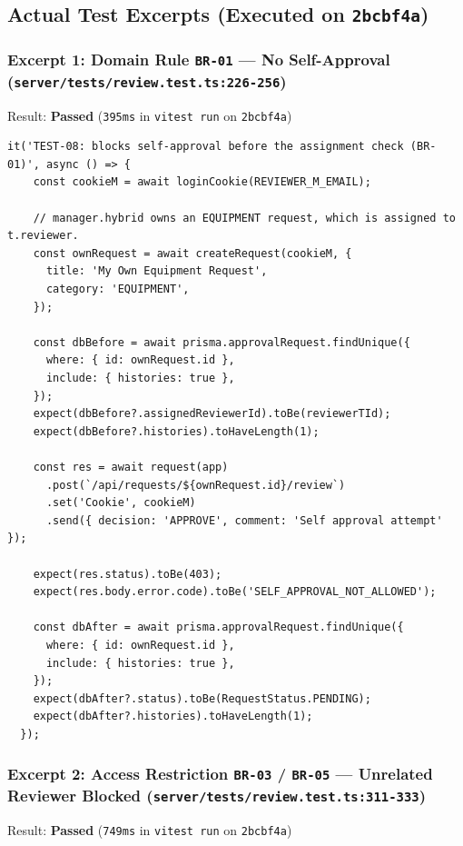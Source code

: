 \documentclass[11pt,a4paper]{article}
\begin{document}
\subsection{Actual Test Excerpts (Executed on \texttt{2bcbf4a})}

\subsubsection{Excerpt 1: Domain Rule \texttt{BR-01} — No Self-Approval (\texttt{server/tests/review.test.ts:226-256})}
Result: \textbf{Passed} (\texttt{395ms} in \texttt{vitest run} on \texttt{2bcbf4a})\\

\begin{lstlisting}[basicstyle=\ttfamily\scriptsize]
  it('TEST-08: blocks self-approval before the assignment check (BR-01)', async () => {
    const cookieM = await loginCookie(REVIEWER_M_EMAIL);

    // manager.hybrid owns an EQUIPMENT request, which is assigned to t.reviewer.
    const ownRequest = await createRequest(cookieM, {
      title: 'My Own Equipment Request',
      category: 'EQUIPMENT',
    });

    const dbBefore = await prisma.approvalRequest.findUnique({
      where: { id: ownRequest.id },
      include: { histories: true },
    });
    expect(dbBefore?.assignedReviewerId).toBe(reviewerTId);
    expect(dbBefore?.histories).toHaveLength(1);

    const res = await request(app)
      .post(`/api/requests/${ownRequest.id}/review`)
      .set('Cookie', cookieM)
      .send({ decision: 'APPROVE', comment: 'Self approval attempt' });

    expect(res.status).toBe(403);
    expect(res.body.error.code).toBe('SELF_APPROVAL_NOT_ALLOWED');

    const dbAfter = await prisma.approvalRequest.findUnique({
      where: { id: ownRequest.id },
      include: { histories: true },
    });
    expect(dbAfter?.status).toBe(RequestStatus.PENDING);
    expect(dbAfter?.histories).toHaveLength(1);
  });
\end{lstlisting}

\subsubsection{Excerpt 2: Access Restriction \texttt{BR-03} / \texttt{BR-05} — Unrelated Reviewer Blocked (\texttt{server/tests/review.test.ts:311-333})}
Result: \textbf{Passed} (\texttt{749ms} in \texttt{vitest run} on \texttt{2bcbf4a})\\
\end{document}
